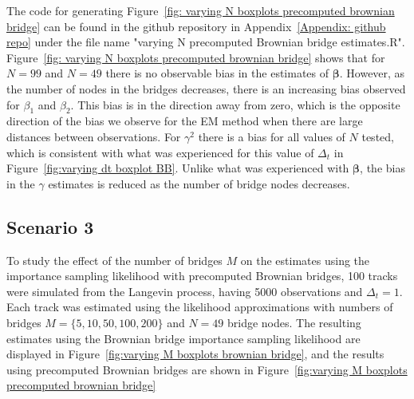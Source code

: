The code for generating Figure~\ref{fig: varying N boxplots precomputed brownian bridge} can be found in the github repository in Appendix~\ref{Appendix: github repo} under the file name "varying N precomputed Brownian bridge estimates.R". Figure~\ref{fig: varying N boxplots precomputed brownian bridge} shows that for $N=99$ and $N=49$ there is no observable bias in the estimates of $\bm \beta$. However, as the number of nodes in the bridges decreases, there is an increasing bias observed for $\beta_1$ and $\beta_2$. This bias is in the direction away from zero, which is the opposite direction of the bias we observe for the EM method when there are large distances between observations. For $\gamma^2$ there is a bias for all values of $N$ tested, which is consistent with what was experienced for this value of $\Delta_t$ in Figure~\ref{fig:varying dt boxplot BB}. Unlike what was experienced with $\bm \beta$, the bias in the $\gamma$ estimates is reduced as the number of bridge nodes decreases.

\subsection{Scenario 3}
To study the effect of the number of bridges $M$ on the estimates using the importance sampling likelihood with precomputed Brownian bridges, 100 tracks were simulated from the Langevin process, having 5000 observations and $\Delta_t = 1$. Each track was estimated using the likelihood approximations with numbers of bridges $M=\{5,10,50,100,200\}$ and $N=49$ bridge nodes. The resulting estimates using the Brownian bridge importance sampling likelihood are displayed in Figure~\ref{fig:varying M boxplots brownian bridge}, and the results using precomputed Brownian bridges are shown in Figure~\ref{fig:varying M boxplots precomputed brownian bridge}


